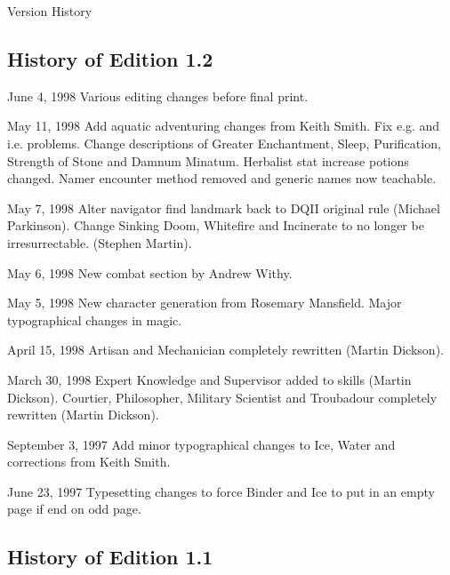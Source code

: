 \begin{Chapter}{Version History}
\subsection{History of Edition 1.2}

\begin{Description}

\item[June 4, 1998] Various editing changes before final print.

\item[May 11, 1998] Add aquatic adventuring changes from Keith Smith.
  Fix e.g. and i.e.  problems.  Change descriptions of Greater
  Enchantment, Sleep, Purification, Strength of Stone and Damnum
  Minatum.  Herbalist stat increase potions changed.  Namer encounter
  method removed and generic names now teachable.

\item[May 7, 1998] Alter navigator find landmark back to DQII original
  rule (Michael Parkinson).  Change Sinking Doom, Whitefire and
  Incinerate to no longer be irresurrectable. (Stephen Martin).

\item[May 6, 1998] New combat section by Andrew Withy.

\item[May 5, 1998] New character generation from Rosemary
  Mansfield. Major typographical changes in magic.

\item[April 15, 1998] Artisan and Mechanician completely rewritten
  (Martin Dickson).

\item[March 30, 1998] Expert Knowledge and Supervisor added to skills
  (Martin Dickson).  Courtier, Philosopher, Military Scientist and
  Troubadour completely rewritten (Martin Dickson).

\item[September 3, 1997] Add minor typographical changes to Ice, Water
  and corrections from Keith Smith.

\item[June 23, 1997] Typesetting changes to force Binder and Ice to
  put in an empty page if end on odd page.

\end{Description}

\subsection{History of Edition 1.1}


\end{Chapter}
